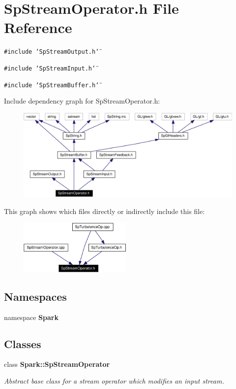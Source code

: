 \section{Sp\-Stream\-Operator.h File Reference}
\label{SpStreamOperator_8h}
{\tt \#include \char`\"{}Sp\-Stream\-Output.h\char`\"{}}\par
{\tt \#include \char`\"{}Sp\-Stream\-Input.h\char`\"{}}\par
{\tt \#include \char`\"{}Sp\-Stream\-Buffer.h\char`\"{}}\par


Include dependency graph for Sp\-Stream\-Operator.h:\begin{figure}[H]
\begin{center}
\leavevmode
\includegraphics[width=321pt]{SpStreamOperator_8h__incl}
\end{center}
\end{figure}


This graph shows which files directly or indirectly include this file:\begin{figure}[H]
\begin{center}
\leavevmode
\includegraphics[width=156pt]{SpStreamOperator_8h__dep__incl}
\end{center}
\end{figure}
\subsection*{Namespaces}
\begin{CompactItemize}
\item 
namespace {\bf Spark}
\end{CompactItemize}
\subsection*{Classes}
\begin{CompactItemize}
\item 
class {\bf Spark::Sp\-Stream\-Operator}
\begin{CompactList}\small\item\em Abstract base class for a stream operator which modifies an input stream. \item\end{CompactList}\end{CompactItemize}
